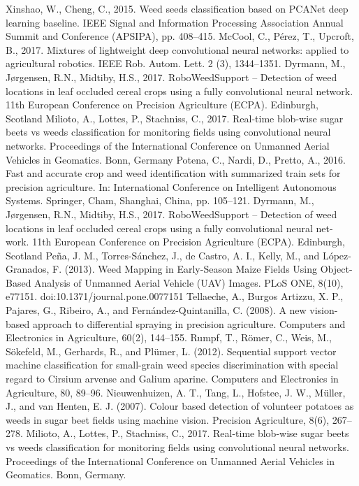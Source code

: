 \documentclass[journal,article,submit,moreauthors,pdftex]{Definitions/mdpi}
\begin{document}
\begin{thebibliography}{999}
 Xinshao, W., Cheng, C., 2015. Weed seeds classification based on PCANet deep learning baseline. IEEE Signal and Information Processing Association Annual Summit and Conference (APSIPA), pp. 408–415.
McCool, C., Pérez, T., Upcroft, B., 2017. Mixtures of lightweight deep convolutional neural networks: applied to agricultural robotics. IEEE Rob. Autom. Lett. 2 (3), 1344–1351.
 Dyrmann, M., Jørgensen, R.N., Midtiby, H.S., 2017. RoboWeedSupport – Detection of weed locations in leaf occluded cereal crops using a fully convolutional neural network. 11th European Conference on Precision Agriculture (ECPA). Edinburgh, Scotland
 Milioto, A., Lottes, P., Stachniss, C., 2017. Real-time blob-wise sugar beets vs weeds classification for monitoring fields using convolutional neural networks. Proceedings of the International Conference on Unmanned Aerial Vehicles in Geomatics. Bonn, Germany
 Potena, C., Nardi, D., Pretto, A., 2016. Fast and accurate crop and weed identification with summarized train sets for precision agriculture. In: International Conference on Intelligent Autonomous Systems. Springer, Cham, Shanghai, China, pp. 105–121.
 Dyrmann, M., Jørgensen, R.N., Midtiby, H.S., 2017. RoboWeedSupport – Detection of weed locations in leaf occluded cereal crops using a fully convolutional neural net- work. 11th European Conference on Precision Agriculture (ECPA). Edinburgh, Scotland
 Peña, J. M., Torres-Sánchez, J., de Castro, A. I., Kelly, M., and López-Granados, F. (2013). Weed Mapping in Early-Season Maize Fields Using Object-Based Analysis of Unmanned Aerial Vehicle (UAV) Images. PLoS ONE, 8(10), e77151. doi:10.1371/journal.pone.0077151
 Tellaeche, A., Burgos Artizzu, X. P., Pajares, G., Ribeiro, A., and Fernández-Quintanilla, C. (2008). A new vision-based approach to differential spraying in precision agriculture. Computers and Electronics in Agriculture, 60(2), 144–155.
 Rumpf, T., Römer, C., Weis, M., Sökefeld, M., Gerhards, R., and Plümer, L. (2012). Sequential support vector machine classification for small-grain weed species discrimination with special regard to Cirsium arvense and Galium aparine. Computers and Electronics in Agriculture, 80, 89–96.
 Nieuwenhuizen, A. T., Tang, L., Hofstee, J. W., Müller, J., and van Henten, E. J. (2007). Colour based detection of volunteer potatoes as weeds in sugar beet fields using machine vision. Precision Agriculture, 8(6), 267–278. 
 Milioto, A., Lottes, P., Stachniss, C., 2017. Real-time blob-wise sugar beets vs weeds classification for monitoring fields using convolutional neural networks. Proceedings of the International Conference on Unmanned Aerial Vehicles in Geomatics. Bonn, Germany.

\end{thebibliography}
\end{document}
